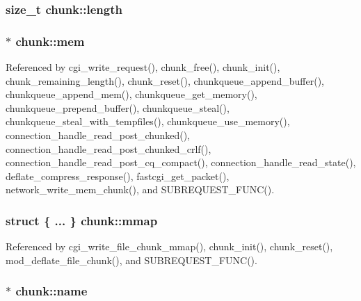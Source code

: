 \hypertarget{structchunk_a0fc193b463a06de50562ef7f9b48d453}{
\subsubsection[{length}]{\setlength{\rightskip}{0pt plus 5cm}size\-\_\-t chunk\-::length}}\label{structchunk_a0fc193b463a06de50562ef7f9b48d453}
\hypertarget{structchunk_ad0664063425b63edf0890cbb8e81d150}{
\subsubsection[{mem}]{$\ast$ chunk\-::mem}}\label{structchunk_ad0664063425b63edf0890cbb8e81d150}


Referenced by cgi\-\_\-write\-\_\-request(), chunk\-\_\-free(), chunk\-\_\-init(), chunk\-\_\-remaining\-\_\-length(), chunk\-\_\-reset(), chunkqueue\-\_\-append\-\_\-buffer(), chunkqueue\-\_\-append\-\_\-mem(), chunkqueue\-\_\-get\-\_\-memory(), chunkqueue\-\_\-prepend\-\_\-buffer(), chunkqueue\-\_\-steal(), chunkqueue\-\_\-steal\-\_\-with\-\_\-tempfiles(), chunkqueue\-\_\-use\-\_\-memory(), connection\-\_\-handle\-\_\-read\-\_\-post\-\_\-chunked(), connection\-\_\-handle\-\_\-read\-\_\-post\-\_\-chunked\-\_\-crlf(), connection\-\_\-handle\-\_\-read\-\_\-post\-\_\-cq\-\_\-compact(), connection\-\_\-handle\-\_\-read\-\_\-state(), deflate\-\_\-compress\-\_\-response(), fastcgi\-\_\-get\-\_\-packet(), network\-\_\-write\-\_\-mem\-\_\-chunk(), and S\-U\-B\-R\-E\-Q\-U\-E\-S\-T\-\_\-\-F\-U\-N\-C().

\hypertarget{structchunk_a77755d5fb4d7f277161089c3a0039e81}{
\subsubsection[{mmap}]{\setlength{\rightskip}{0pt plus 5cm}struct \{ ... \}   chunk\-::mmap}}\label{structchunk_a77755d5fb4d7f277161089c3a0039e81}


Referenced by cgi\-\_\-write\-\_\-file\-\_\-chunk\-\_\-mmap(), chunk\-\_\-init(), chunk\-\_\-reset(), mod\-\_\-deflate\-\_\-file\-\_\-chunk(), and S\-U\-B\-R\-E\-Q\-U\-E\-S\-T\-\_\-\-F\-U\-N\-C().

\hypertarget{structchunk_a6db241a6c7ff77727d0f0d8ced77b2a2}{
\subsubsection[{name}]{$\ast$ chunk\-::name}}\label{structchunk_a6db241a6c7ff77727d0f0d8ced77b2a2}


